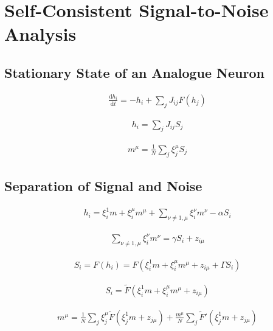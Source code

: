 \documentclass{article}
\begin{document}
\clearpage

\section{Self-Consistent Signal-to-Noise Analysis}

\subsection{Stationary State of an Analogue Neuron}

\begin{align*}
\frac{\mathrm{d} h_i}{\mathrm{d} t} = -h_i + \sum_j J_{ij} F(h_j)\tag{7.38}
\end{align*}

\begin{align*}
h_i = \sum_j J_{ij} S_j\tag{7.39}
\end{align*}

\begin{align*}
m^\mu = \frac{1}{N} \sum_j \xi_j^\mu S_j\tag{7.40}
\end{align*}

\subsection{Separation of Signal and Noise}

\begin{align*}
h_i = \xi_i^1 m + \xi_i^\mu m^\mu + \sum_{\nu \neq 1, \mu} \xi_i^\nu m^\nu - \alpha S_i\tag{7.41}
\end{align*}

\begin{align*}
\sum_{\nu \neq 1, \mu} \xi_i^\nu m^\nu = \gamma S_i + z_{i \mu}\tag{7.42}
\end{align*}

\begin{align*}
S_i = F(h_i)= F\left( \xi_i^1 m + \xi_i^\mu m^\mu + z_{i \mu} + \Gamma S_i \right)\tag{7.43}
\end{align*}

\begin{align*}
S_i = \tilde{F}\left( \xi_i^1 m + \xi_i^\mu m^\mu + z_{i \mu} \right)\tag{7.44}
\end{align*}

\begin{align*}
m^\mu = \frac{1}{N} \sum_j \xi_j^\mu \tilde{F}\left( \xi_j^1 m + z_{j \mu} \right) + \frac{m^\mu}{N} \sum_j \tilde{F}'\left( \xi_j^1 m + z_{j \mu} \right)\tag{7.45}
\end{align*}
\end{document}

